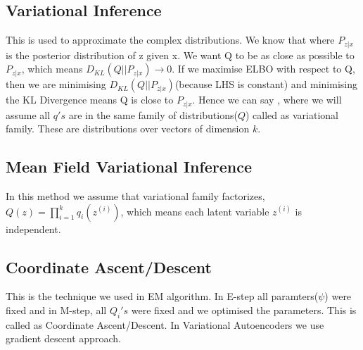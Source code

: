 \documentclass[10pt,a4paper,twoside]{tau-book}
\begin{document}
\subsection{Variational Inference}

This is used to approximate the complex distributions. We know that  where $P_{z|x}$ is the posterior distribution of z given x. We want Q to be as close as possible to $P_{z|x}$, which means $D_{KL}(Q||P_{z|x}) \longrightarrow 0$. If we maximise ELBO with respect to Q, then we are minimising $D_{KL}(Q||P_{z|x})$(because LHS is constant) and minimising the KL Divergence means Q is close to $P_{z|x}$. Hence we can say , where we will assume all $q's$ are in the same family of distributions($Q$) called as variational family. These are distributions over vectors of dimension $k$.

\subsection{Mean Field Variational Inference}
In this method we assume that variational family factorizes,$Q(z) = \prod_{i=1}^{k} q_i(z^{(i)})$, which means each latent variable $z^{(i)}$ is independent.

\subsection{Coordinate Ascent/Descent}
This is the technique we used in EM algorithm. In E-step all paramters($\psi$) were fixed and in M-step, all $Q_i's$ were fixed and we optimised the parameters. This is called as Coordinate Ascent/Descent. In Variational Autoencoders we use gradient descent approach.
\end{document}
